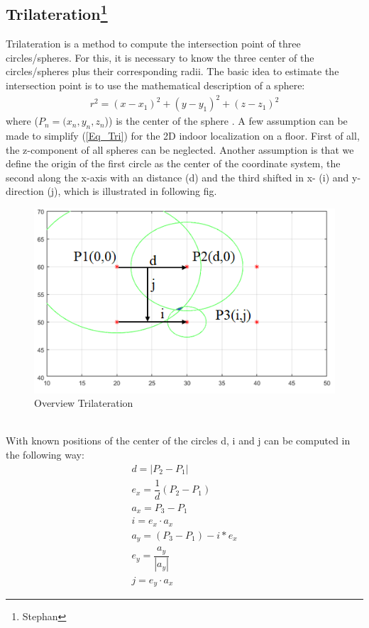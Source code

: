 \subsection[Trilateration]{Trilateration\footnote{Stephan}}
Trilateration is a method to compute the intersection point of three circles/spheres. For this, it is necessary to know the three center of the circles/spheres plus their corresponding radii. The basic idea to estimate the intersection point is to use the mathematical description of a sphere:
\begin{align}\label{Eq_Tri}
r^2 = (x-x_1)^2 + (y-y_1)^2 + (z-z_1)^2  
\end{align} 
where ($P_n=(x_n,y_n,z_n$)) is the center of the sphere \cite{Cotera.2016}. A few assumption can be made to simplify (\ref{Eq_Tri}) for the 2D indoor localization on a floor. First of all, the z-component of all spheres can be neglected. Another assumption is that we define the origin of the first circle as the center of the coordinate system, the second along the x-axis with an distance (d) and the third shifted in x- (i) and y-direction (j), which is illustrated in following fig.\\ 
\begin{figure}[!htbp]
 \centering
 \includegraphics[width = 13cm]{Pictures/Trilateration_1}
 \caption{Overview Trilateration}
 \label{Tri_1}
 \end{figure}\\ 
With known positions of the center of the circles d, i and j can be computed in the following way\cite{Cotera.2016}:
\begin{align}
d = |P_2 - P_1| \\ 
e_x = \dfrac{1}{d}(P_2 - P_1) \\
a_x = P_3 - P_1 \\
i = e_x \cdot a_x \\
a_y = (P_3 - P_1) - i * e_x \\
e_y = \dfrac{a_y}{|a_y|} \\
j = e_y \cdot a_x
\end{align}
